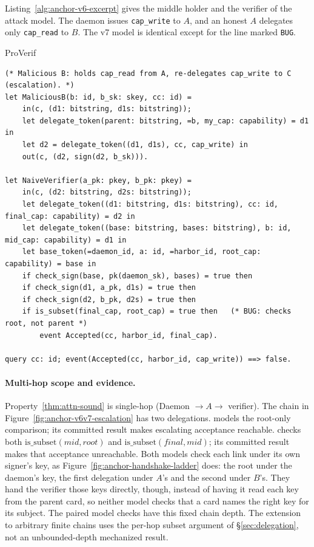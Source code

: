 \documentclass[11pt,a4paper]{article}
\theoremstyle{definition}
\begin{document}


Listing~\ref{alg:anchor-v6-excerpt} gives the middle holder and the verifier
of the attack model. The daemon issues \texttt{cap\_write} to $A$, and an
honest $A$ delegates only \texttt{cap\_read} to $B$. The v7 model is
identical except for the line marked \texttt{BUG}.

\begin{pdlisting}{ProVerif}{}
\begin{lstlisting}[caption={\texttt{harbor\_card\_v6\_multihop\_attack.pv} (excerpt): the middle holder and the verifier},label={alg:anchor-v6-excerpt}]
(* Malicious B: holds cap_read from A, re-delegates cap_write to C (escalation). *)
let MaliciousB(b: id, b_sk: skey, cc: id) =
    in(c, (d1: bitstring, d1s: bitstring));
    let delegate_token(parent: bitstring, =b, my_cap: capability) = d1 in
    let d2 = delegate_token((d1, d1s), cc, cap_write) in
    out(c, (d2, sign(d2, b_sk))).

let NaiveVerifier(a_pk: pkey, b_pk: pkey) =
    in(c, (d2: bitstring, d2s: bitstring));
    let delegate_token((d1: bitstring, d1s: bitstring), cc: id, final_cap: capability) = d2 in
    let delegate_token((base: bitstring, bases: bitstring), b: id, mid_cap: capability) = d1 in
    let base_token(=daemon_id, a: id, =harbor_id, root_cap: capability) = base in
    if check_sign(base, pk(daemon_sk), bases) = true then
    if check_sign(d1, a_pk, d1s) = true then
    if check_sign(d2, b_pk, d2s) = true then
    if is_subset(final_cap, root_cap) = true then   (* BUG: checks root, not parent *)
        event Accepted(cc, harbor_id, final_cap).

query cc: id; event(Accepted(cc, harbor_id, cap_write)) ==> false.
\end{lstlisting}
\end{pdlisting}

\paragraph{Multi-hop scope and evidence.}
Property~\ref{thm:attn-sound} is single-hop (Daemon $\to A\to$ verifier).
The chain in Figure~\ref{fig:anchor-v6v7-escalation} has two delegations.
 models the root-only
comparison; its committed result makes escalating acceptance reachable.
 checks both
$\mathrm{is\_subset}(\mathit{mid},\mathit{root})$ and
$\mathrm{is\_subset}(\mathit{final},\mathit{mid})$; its committed result
makes that acceptance unreachable. Both models check each link under its own
signer's key, as Figure~\ref{fig:anchor-handshake-ladder} does: the root under
the daemon's key, the first delegation under $A$'s and the second under $B$'s.
They hand the verifier those keys directly, though, instead of having it read
each key from the parent card, so neither model checks that a card names the
right key for its subject. The paired model checks have this fixed
chain depth. The extension to arbitrary finite chains uses the per-hop
subset argument of \S\ref{sec:delegation}, not an unbounded-depth
mechanized result.
\end{document}
